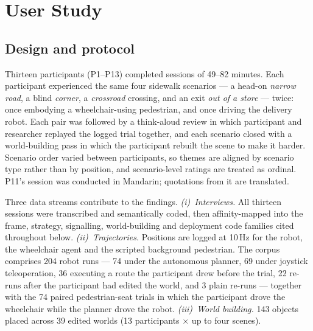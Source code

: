 %
%

\section{User Study}
\label{sec:study}

\subsection{Design and protocol}
\label{sec:study:design}

Thirteen participants (P1--P13) completed sessions of 49--82 minutes.
Each participant experienced the same four sidewalk scenarios --- a
head-on \emph{narrow road}, a blind \emph{corner}, a \emph{crossroad}
crossing, and an exit \emph{out of a store} --- twice: once embodying a
wheelchair-using pedestrian, and once driving the delivery robot. Each
pair was followed by a think-aloud review in which participant and
researcher replayed the logged trial together, and each scenario closed
with a world-building pass in which the participant rebuilt the scene
to make it harder. Scenario order varied between participants, so
themes are aligned by scenario type rather than by position, and
scenario-level ratings are treated as ordinal. P11's session was
conducted in Mandarin; quotations from it are translated.

Three data streams contribute to the findings.
\emph{(i)~Interviews.} All thirteen sessions were transcribed and
semantically coded, then affinity-mapped into the frame, strategy,
signalling, world-building and deployment code families cited
throughout below.
\emph{(ii)~Trajectories.} Positions are logged at 10\,Hz for the robot,
the wheelchair agent and the scripted background pedestrian. The
corpus comprises 204 robot runs --- 74 under the autonomous planner, 69
under joystick teleoperation, 36 executing a route the participant drew
before the trial, 22 re-runs after the participant had edited the
world, and 3 plain re-runs --- together with the 74 paired
pedestrian-seat trials in which the participant drove the wheelchair
while the planner drove the robot.
\emph{(iii)~World building.} 143 objects placed across 39 edited worlds
(13 participants $\times$ up to four scenes).

